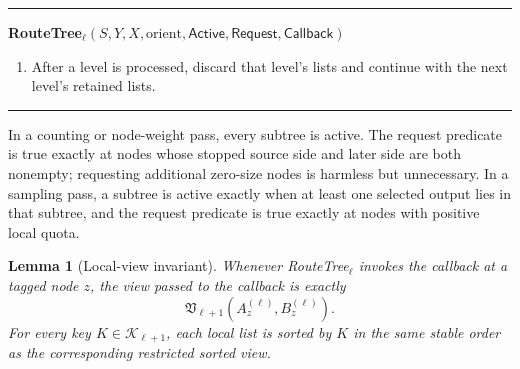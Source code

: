 \documentclass[11pt]{article}
\newcommand{\Callback}{\ensuremath{\mathsf{Callback}}}
\newcommand{\Request}{\ensuremath{\mathsf{Request}}}
\newcommand{\Active}{\ensuremath{\mathsf{Active}}}
\newcommand{\Lat}{\ensuremath{\mathsf{Lat}}}
\newcommand{\Stop}{\ensuremath{\mathsf{Stop}}}
\newcommand{\true}{\ensuremath{\mathsf{true}}}
\newtheorem{lemma}[theorem]{Lemma}
\theoremstyle{definition}
\newenvironment{algorithmbox}[1]{%
  \par\medskip\noindent\hrule\smallskip
  \noindent\textbf{#1}\par\smallskip
  \begin{enumerate}[leftmargin=1.7em,itemsep=2pt,topsep=2pt]
}{%
  \end{enumerate}
  \smallskip\hrule\medskip
}
\begin{document}
\begin{algorithmbox}{RouteTree$_\ell(S,Y,X,\mathrm{orient},\Active,\Request,\Callback)$}
\begin{enumerate}[leftmargin=1.5em,itemsep=1pt,topsep=1pt]
\begin{itemize}[leftmargin=1.5em,itemsep=1pt,topsep=1pt]
    \item in the $B$-tree orientation, $\Stop_K(z)$ is the $A_z^K$ list and $\Lat_K(z)$ is the $B_z^K$ list;
    \item in the $A$-tree orientation, $\Lat_K(z)$ is the $A_z^K$ list and $\Stop_K(z)$ is the $B_z^K$ list.
    \end{itemize}
    Pass the resulting $\mathfrak V_{\ell+1}(A_z,B_z)$ to $\Callback$.
  \item Retain a child list only if the child has nonempty real interval and $\Active(\mathrm{child})=\true$.
  \end{enumerate}
\item After a level is processed, discard that level's lists and continue with the next level's retained lists.
\end{algorithmbox}

In a counting or node-weight pass, every subtree is active.  The request predicate is true exactly at nodes whose stopped source side and later side are both nonempty; requesting additional zero-size nodes is harmless but unnecessary.  In a sampling pass, a subtree is active exactly when at least one selected output lies in that subtree, and the request predicate is true exactly at nodes with positive local quota.

\begin{lemma}[Local-view invariant]
\label{lem:local-view}
Whenever RouteTree$_\ell$ invokes the callback at a tagged node $z$, the view passed to the callback is exactly
\[
  \mathfrak V_{\ell+1}(A_z^{(\ell)},B_z^{(\ell)}).
\]
For every key $K\in\mathcal K_{\ell+1}$, each local list is sorted by $K$ in the same stable order as the corresponding restricted sorted view.
\end{lemma}
\end{document}
